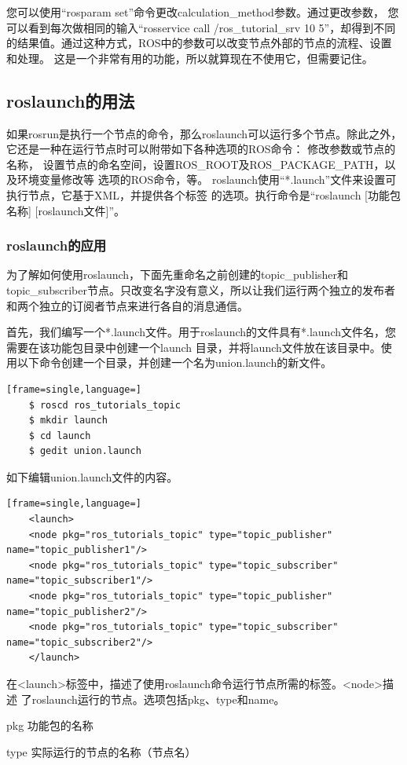 \documentclass[geye,green,kindle,cn]{elegantnote}
\begin{document}
您可以使用“rosparam set”命令更改calculation_method参数。通过更改参数， 您可以看到每次做相同的输入“rosservice call /ros_tutorial_srv 10 5”，却得到不同 的结果值。通过这种方式，ROS中的参数可以改变节点外部的节点的流程、设置和处理。 这是一个非常有用的功能，所以就算现在不使用它，但需要记住。
\subsection{roslaunch的用法}
如果rosrun是执行一个节点的命令，那么roslaunch可以运行多个节点。除此之外， 它还是一种在运行节点时可以附带如下各种选项的ROS命令： 修改参数或节点的名称， 设置节点的命名空间，设置ROS_ROOT及ROS_PACKAGE_PATH，以及环境变量修改等 选项的ROS命令，等。 roslaunch使用“*.launch”文件来设置可执行节点，它基于XML，并提供各个标签 的选项。执行命令是“roslaunch [功能包名称] [roslaunch文件]”。
\subsubsection{roslaunch的应用}
为了解如何使用roslaunch，下面先重命名之前创建的topic_publisher和topic_subscriber节点。只改变名字没有意义，所以让我们运行两个独立的发布者和两个独立的订阅者节点来进行各自的消息通信。

首先，我们编写一个*.launch文件。用于roslaunch的文件具有*.launch文件名，您需要在该功能包目录中创建一个launch 目录，并将launch文件放在该目录中。使用以下命令创建一个目录，并创建一个名为union.launch的新文件。
\begin{lstlisting}[frame=single,language=]
    $ roscd ros_tutorials_topic 
    $ mkdir launch 
    $ cd launch 
    $ gedit union.launch 
\end{lstlisting}

如下编辑union.launch文件的内容。
\begin{lstlisting}[frame=single,language=]
    <launch>    
    <node pkg="ros_tutorials_topic" type="topic_publisher" name="topic_publisher1"/>    
    <node pkg="ros_tutorials_topic" type="topic_subscriber" name="topic_subscriber1"/>    
    <node pkg="ros_tutorials_topic" type="topic_publisher" name="topic_publisher2"/>    
    <node pkg="ros_tutorials_topic" type="topic_subscriber" name="topic_subscriber2"/> 
    </launch> 
\end{lstlisting}

在<launch>标签中，描述了使用roslaunch命令运行节点所需的标签。<node>描述 了roslaunch运行的节点。选项包括pkg、type和name。 

pkg   功能包的名称

type  实际运行的节点的名称（节点名）
\end{document}
